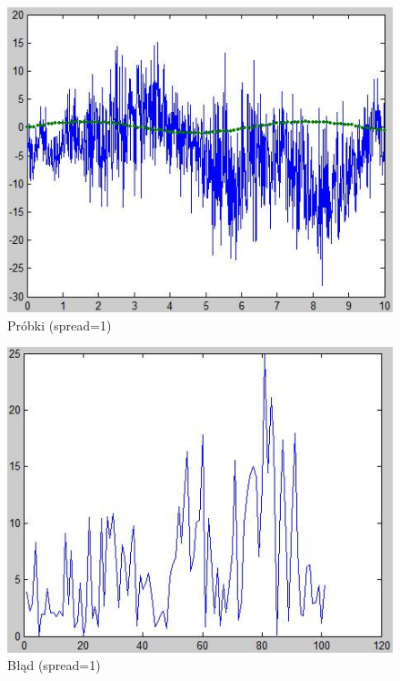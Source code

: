 \begin{figure}[!h]
\centering
\includegraphics[scale=0.8]{src/1_wykres.png}\caption{\label{fig:0.08_wykres}Próbki (spread=1)}
\end{figure}

\begin{figure}[!h]
\centering
\includegraphics[scale=0.8]{src/1_blad.png}\caption{\label{fig:0.08_blad}Błąd (spread=1)}
\end{figure}

